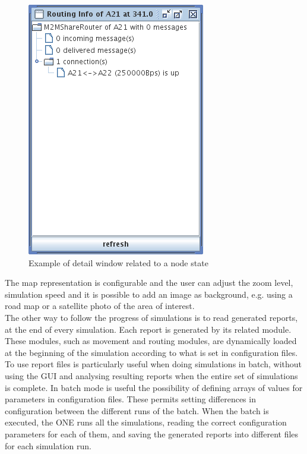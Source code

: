 \begin{figure}[htpb]
  \begin{center}
    \includegraphics[scale=0.6]{5-simulatore/img/Routing-Info.png}
    \caption{Example of detail window related to a node state}    
    \label{Routing-Info}
  \end{center}
\end{figure}

The map representation is configurable and the user can adjust the zoom level, simulation speed and it is possible to add an image as background, e.g. using a road map or a satellite photo of the area of interest.
\\

The other way to follow the progress of simulations is to read generated reports, at the end of every simulation. Each report is generated by its related module. These modules, such as movement and routing modules, are dynamically loaded at the beginning of the simulation according to what is set in configuration files. To use report files is particularly useful when doing simulations in batch, without using the GUI and analysing resulting reports when the entire set of simulations is complete. In batch mode is useful the possibility of defining arrays of values for parameters in configuration files. These permits setting differences in configuration between the different runs of the batch. When the batch is executed, the ONE runs all the simulations, reading the correct configuration parameters for each of them, and saving the generated reports into different files for each simulation run.
\\

